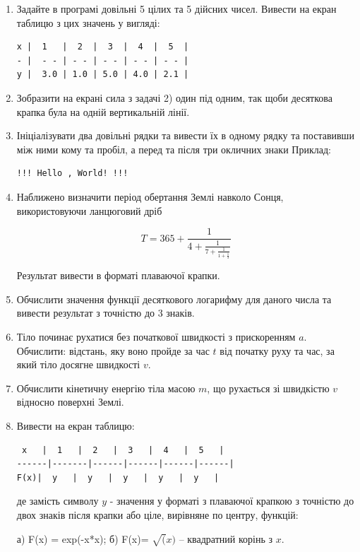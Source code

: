 \documentclass[a5paper,titlepage,openany,twoside,draft]{book_unv}%
\begin{document}
\begin{enumerate}
\def\labelenumi{\arabic{enumi}.}
\setcounter{enumi}{9}
\item
  Задайте в програмі довільні 5 цілих та 5 дійсних чисел. Вивести на екран таблицю
з цих значень у вигляді:
\begin{verbatim}
x |  1   |  2  |  3  |  4  |  5  |
- |  - - | - - | - - | - - | - - |
y |  3.0 | 1.0 | 5.0 | 4.0 | 2.1 |
\end{verbatim}

\item
  Зобразити на екрані сила з задачі 2) один під одним, так щоби десяткова крапка була
на одній вертикальній лінії.

\item
  Ініціалізувати два довільні рядки та вивести їх в одному рядку та 
поставивши між ними кому та пробіл, а перед та після три окличних знаки
  Приклад:
\begin{verbatim}
!!! Hello , World! !!!
\end{verbatim}
\item
  Наближено визначити період обертання Землі навколо Сонця,
  використовуючи ланцюговий дріб

\[T = 365 + \frac{1}{4 + \frac{1}{7 + \frac{1}{1 + \frac{1}{3}}}}\]

Результат вивести в форматі плаваючої крапки.

\item
  Обчислити значення функції десяткового логарифму для даного числа та
  вивести результат з точністю до 3 знаків.
\item
  Тіло починає рухатися без початкової швидкості з прискоренням
  \(a\). Обчислити: відстань, яку воно пройде за час \(t\) від початку руху та
час, за який тіло досягне швидкості \(v\).

\item
  Обчислити кінетичну енергію тіла масою \(m\), що рухається зі
  швидкістю \(v\) відносно поверхні Землі.
\item
  Вивести на екран таблицю:
\begin{verbatim}
 x   |  1   |  2   |  3   |  4   |  5   |
------|-------|------|------|------|------|
F(x)|  y   |  y   |  y   |  y   |  y   |
\end{verbatim}

де замість символу $y$ - значення у форматі з плаваючої крапкою з точністю
до двох знаків після крапки або ціле, вирівняне по центру, функцій:

а) F(x) = exp(-x*x); б) F(x)= $\sqrt(x)$ -- квадратний корінь з $x$.


\end{enumerate}
\end{document}
